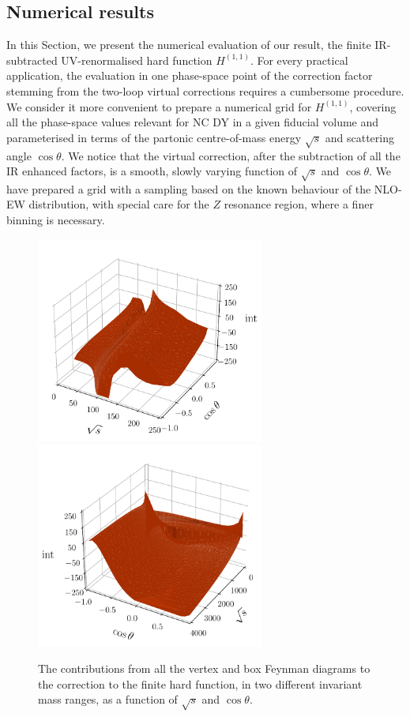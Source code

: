 \documentclass[11pt,a4paper]{article}
\begin{document}
\subsection{Numerical results}
\label{sec:numerics}
%
In this Section, we present the numerical evaluation of our result,
the finite IR-subtracted UV-renormalised hard function ${H}^{(1,1)}$.
For every practical application,
the evaluation in one phase-space point of the correction factor
stemming from the two-loop \oaas virtual corrections
requires a cumbersome procedure.
We consider it more convenient to prepare a numerical grid for
${H}^{(1,1)}$,
covering all the phase-space values relevant for
NC DY in a given fiducial volume and parameterised in terms of
the partonic centre-of-mass energy $\sqrt{s}$ and scattering angle $\cos\theta$.
We notice that the virtual correction,
after the subtraction of all the IR enhanced factors, is a smooth,
slowly varying function of  $\sqrt{s}$ and $\cos\theta$.
We have prepared a grid with a sampling based on the known behaviour
of the NLO-EW distribution,
with special care for the $Z$ resonance region,
where a finer binning is necessary.
\begin{figure}[t]
\begin{center}
\includegraphics[width=7.5cm]{plots/correction-VB-noFSR-250.pdf}
\includegraphics[width=7.5cm]{plots/correction-VB-noFSR-extended.pdf}
\end{center}
\vspace{-2ex}
\caption{\label{fig:correction}
 The contributions from all the vertex and box Feynman diagrams
 to the \oaas correction to the finite hard function,
  in two different invariant mass ranges,
  as a function of $\sqrt{s}$ and $\cos\theta$.
  }
\end{figure}
\end{document}
